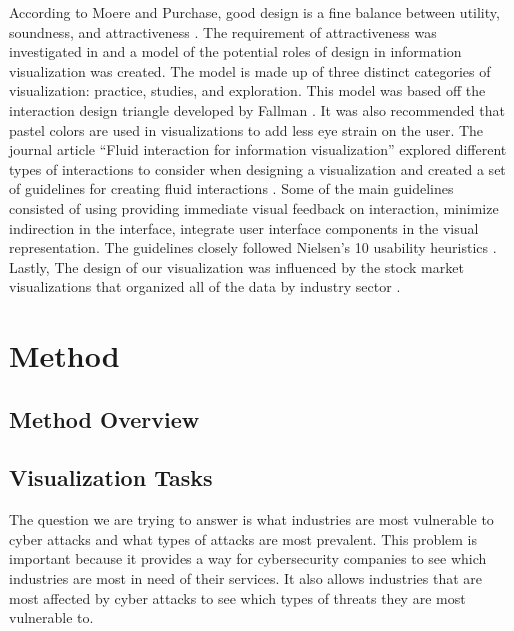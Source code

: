 \documentclass[journal]{vgtc}                %
\begin{document}
According to Moere and Purchase, good design is a fine balance between utility, soundness, and attractiveness \cite{S7}. 
The requirement of attractiveness was investigated in and a model of the potential roles of design in information visualization was created. 
The model is made up of three distinct categories of visualization: practice, studies, and exploration. 
This model was based off the interaction design triangle developed by Fallman \cite{S6}. 
It was also recommended that pastel colors are used in visualizations to add less eye strain on the user. 
The journal article “Fluid interaction for information visualization” explored different types of interactions to consider when designing a visualization and created a set of guidelines for creating fluid interactions \cite{S8}. 
Some of the main guidelines consisted of using providing immediate visual feedback on interaction, minimize indirection in the interface, integrate user interface components in the visual representation. 
The guidelines closely followed Nielsen’s 10 usability heuristics \cite{S9}. 
Lastly, The design of our visualization was influenced by the stock market visualizations that organized all of the data by industry sector \cite{S10}. 

\section{Method}

\subsection{Method Overview}

\subsection{Visualization Tasks}
The question we are trying to answer is what industries are most vulnerable to cyber attacks and what types of attacks are most prevalent. 
This problem is important because it provides a way for cybersecurity companies to see which industries are most in need of their services. 
It also allows industries that are most affected by cyber attacks to see which types of threats they are most vulnerable to.
\end{document}
